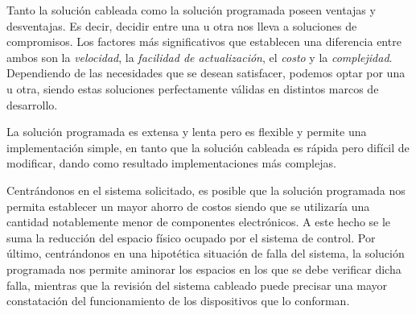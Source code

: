 \documentclass{article}
\begin{document}
	Tanto la solución cableada como la solución programada poseen ventajas y desventajas. Es decir, decidir entre una u otra nos lleva a soluciones de compromisos. Los factores más significativos que establecen una diferencia entre ambos son la \textit{velocidad}, la \textit{facilidad de actualización}, el \textit{costo} y la \textit{complejidad}. Dependiendo de las necesidades que se desean satisfacer, podemos optar por una u otra, siendo estas soluciones perfectamente válidas en distintos marcos de desarrollo.
	\par
	La solución programada es extensa y lenta pero es flexible y permite una implementación simple, en tanto que la solución cableada es rápida pero difícil de modificar, dando como resultado implementaciones más complejas. 
	\par
	Centrándonos en el sistema solicitado, es posible que la solución programada nos permita establecer un mayor ahorro de costos siendo que se utilizaría una cantidad notablemente menor de componentes electrónicos. A este hecho se le suma la reducción del espacio físico ocupado por el sistema de control. Por último, centrándonos en una hipotética situación de falla del sistema, la solución programada nos permite aminorar los espacios en los que se debe verificar dicha falla, mientras que la revisión del sistema cableado puede precisar una mayor constatación del funcionamiento de los dispositivos que lo conforman.
\end{document}
